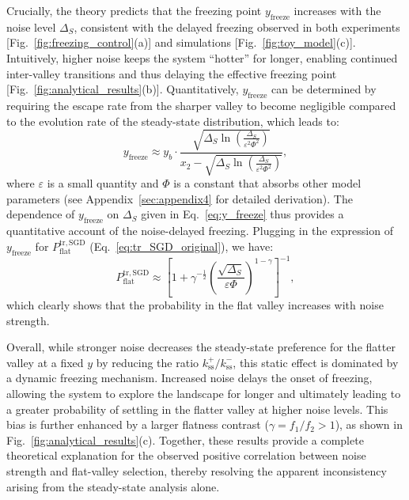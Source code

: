 \documentclass[aps,prx,reprint,superscriptaddress,longbibliography,nofootinbib,floatfix]{revtex4-2}
\begin{document}
Crucially, the theory predicts that the freezing point $y_\mathrm{freeze}$ increases with the noise level $\Delta_S$, consistent with the delayed freezing observed in both experiments [Fig.~\ref{fig:freezing_control}(a)] and simulations [Fig.~\ref{fig:toy_model}(c)]. Intuitively, higher noise keeps the system ``hotter'' for longer, enabling continued inter-valley transitions and thus delaying the effective freezing point [Fig.~\ref{fig:analytical_results}(b)]. Quantitatively, $y_\mathrm{freeze}$ can be determined by requiring the escape rate from the sharper valley to become negligible compared to the evolution rate of the steady-state distribution, which leads to: 
\begin{equation}
y_\mathrm{freeze} \approx y_b \cdot \frac{\sqrt{\Delta_S \ln\left( \frac{\Delta_S}{\varepsilon^2 \Phi^2} \right)}}{x_2 - \sqrt{\Delta_S \ln\left( \frac{\Delta_S}{\varepsilon^2 \Phi^2} \right)}},
\label{eq:y_freeze}
\end{equation}
where $\varepsilon$ is a small quantity and $\Phi$ is a constant that absorbs other model parameters (see Appendix~\ref{sec:appendix4} for detailed derivation). The dependence of $y_\mathrm{freeze}$ on $\Delta_S$ given in Eq.~\ref{eq:y_freeze} thus provides a quantitative account of the noise-delayed freezing. Plugging in the expression of $y_\mathrm{freeze}$ for $P_{\mathrm{flat}}^{\mathrm{tr,SGD}}$ (Eq.~\ref{eq:tr_SGD_original}), we have:
\begin{equation}
P_{\mathrm{flat}}^{\mathrm{tr,SGD}} \approx \left[ 1 + \gamma^{-\frac{1}{2}} \left( \frac{\sqrt{\Delta_S}}{\varepsilon \Phi} \right)^{1-\gamma} \right]^{-1},
\label{eq:tr_SGD}
\end{equation}
which clearly shows that the probability in the flat valley increases with noise strength.

Overall, while stronger noise decreases the steady-state preference for the flatter valley at a fixed $y$ by reducing the ratio $k_\mathrm{ss}^{+}/k_\mathrm{ss}^{-}$, this static effect is dominated by a dynamic freezing mechanism. Increased noise delays the onset of freezing, allowing the system to explore the landscape for longer and ultimately leading to a greater probability of settling in the flatter valley at higher noise levels. This bias is further enhanced by a larger flatness contrast ($\gamma=f_1/f_2>1$), as shown in Fig.~\ref{fig:analytical_results}(c). Together, these results provide a complete theoretical explanation for the observed positive correlation between noise strength and flat-valley selection, thereby resolving the apparent inconsistency arising from the steady-state analysis alone.
\end{document}
